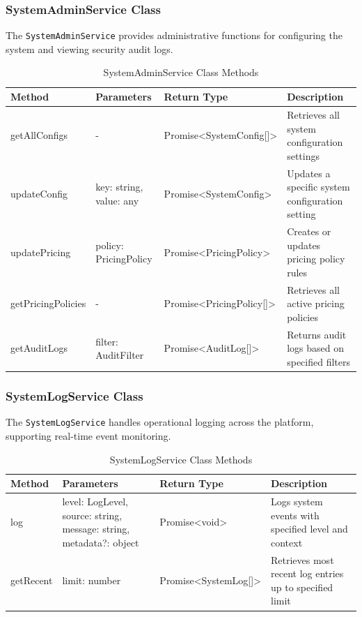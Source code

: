 \subsubsection{SystemAdminService Class}
The \texttt{SystemAdminService} provides administrative functions for configuring the system and viewing security audit logs.

\begin{table}[H]
\centering
\footnotesize
\renewcommand{\arraystretch}{1.3}
\begin{tabularx}{\textwidth}{|>{\RaggedRight\arraybackslash}X|>{\RaggedRight\arraybackslash}X|>{\RaggedRight\arraybackslash}X|>{\RaggedRight\arraybackslash}X|}
\hline
\textbf{Method} & \textbf{Parameters} & \textbf{Return Type} & \textbf{Description} \\
\hline
getAllConfigs & - & Promise<SystemConfig[]> & Retrieves all system configuration settings \\
\hline
updateConfig & key: string, value: any & Promise<SystemConfig> & Updates a specific system configuration setting \\
\hline
updatePricing & policy: PricingPolicy & Promise<PricingPolicy> & Creates or updates pricing policy rules \\
\hline
getPricingPolicies & - & Promise<PricingPolicy[]> & Retrieves all active pricing policies \\
\hline
getAuditLogs & filter: AuditFilter & Promise<AuditLog[]> & Returns audit logs based on specified filters \\
\hline
\end{tabularx}
\caption{SystemAdminService Class Methods}
\label{tab:system-admin-service-methods}
\end{table}

\subsubsection{SystemLogService Class}
The \texttt{SystemLogService} handles operational logging across the platform, supporting real-time event monitoring.

\begin{table}[H]
\centering
\footnotesize
\renewcommand{\arraystretch}{1.3}
\begin{tabularx}{\textwidth}{|>{\RaggedRight\arraybackslash}X|>{\RaggedRight\arraybackslash}X|>{\RaggedRight\arraybackslash}X|>{\RaggedRight\arraybackslash}X|}
\hline
\textbf{Method} & \textbf{Parameters} & \textbf{Return Type} & \textbf{Description} \\
\hline
log & level: LogLevel, source: string, message: string, metadata?: object & Promise<void> & Logs system events with specified level and context \\
\hline
getRecent & limit: number & Promise<SystemLog[]> & Retrieves most recent log entries up to specified limit \\
\hline
\end{tabularx}
\caption{SystemLogService Class Methods}
\label{tab:system-log-service-methods}
\end{table}

